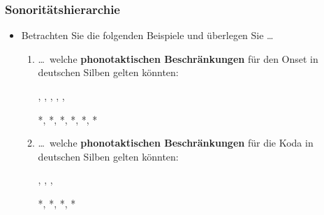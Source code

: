 \begin{frame}
\frametitle{Sonoritätshierarchie}

\begin{itemize}
	\item Betrachten Sie die folgenden Beispiele und überlegen Sie \ldots
	
	\begin{enumerate}
		\item \ldots\ welche \textbf{phonotaktischen Beschränkungen} für den Onset in deutschen Silben gelten könnten:

                  \ea
                  , , ,
                  , , 
                  \z

                  \ea
                  *, *, *, *, *, *
                  \z
                  
\pause
		\item \ldots\ welche \textbf{phonotaktischen Beschränkungen} für die Koda in deutschen Silben gelten könnten:

                  \ea
                  , , , 
                  \z

                  \ea
                  *\textipa{[ka{tl}]}, *\textipa{[ha{t\textscr}]}, *,
                  *
                  \z

	\end{enumerate}
	
\end{itemize}

\end{frame}



